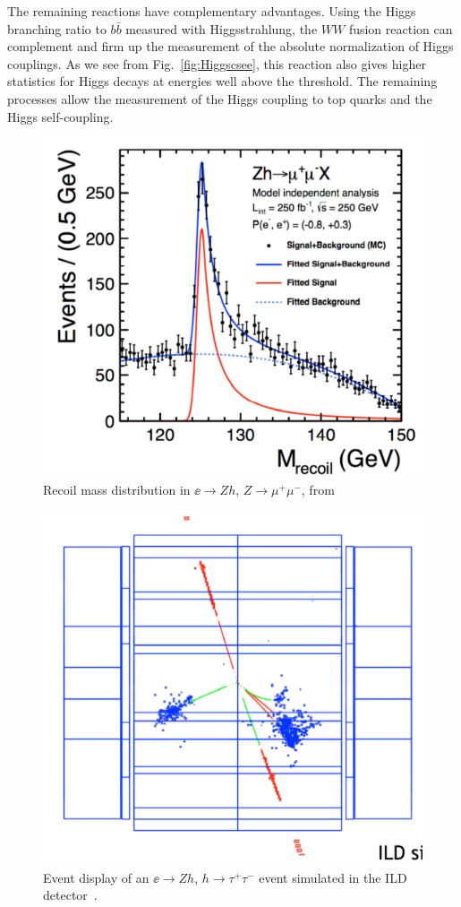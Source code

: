 \documentclass[12pt]{article}
\begin{document}
The remaining reactions have complementary advantages.  Using the
Higgs branching ratio to $b\bar b$ measured with Higgsstrahlung, the
$WW$ fusion reaction can complement and firm up the measurement of the
absolute normalization of Higgs couplings.   As we see from
Fig.~\ref{fig:Higgscsee}, this reaction also gives higher statistics
for Higgs decays
at energies well above the threshold.    The remaining processes allow
the measurement of the Higgs coupling to top quarks and the Higgs
self-coupling.




\begin{figure}
\begin{center}
\includegraphics[width=0.65\hsize]{eeHiggsmumu.pdf}
\end{center}
\caption{Recoil mass distribution in $\ee\to Zh$, $Z\to \mu^+\mu^-$,
  from \cite{Recoil1}}
\label{fig:mumumass}
\end{figure}

\begin{figure}
\begin{center}
\includegraphics[width=0.6\hsize]{tautau.pdf}
\end{center}
\caption{Event display of an $\ee\to Zh$, $h \to
  \tau^+\tau^-$ event simulated in the ILD detector~\cite{Ruan}.}
\label{fig:tautau}
\end{figure}
\end{document}
